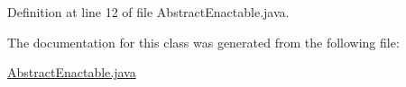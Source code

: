 Definition at line 12 of file Abstract\-Enactable.java.

The documentation for this class was generated from the following file:\begin{CompactItemize}
\item 
\hyperlink{AbstractEnactable_8java-source}{Abstract\-Enactable.java}\end{CompactItemize}
